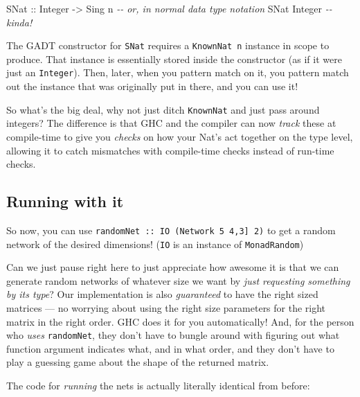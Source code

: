 \documentclass[]{article}
\newenvironment{Shaded}{}{}
\newcommand{\CommentTok}[1]{\textcolor[rgb]{0.38,0.63,0.69}{\textit{#1}}}
\newcommand{\DataTypeTok}[1]{\textcolor[rgb]{0.56,0.13,0.00}{#1}}
\newcommand{\NormalTok}[1]{#1}
\newcommand{\OtherTok}[1]{\textcolor[rgb]{0.00,0.44,0.13}{#1}}
\begin{document}
\begin{Shaded}
\begin{Highlighting}[]
\DataTypeTok{SNat}\OtherTok{ ::} \DataTypeTok{Integer} \OtherTok{{-}\textgreater{}} \DataTypeTok{Sing}\NormalTok{ n}
\CommentTok{{-}{-} or, in normal data type notation}
\DataTypeTok{SNat} \DataTypeTok{Integer}
\CommentTok{{-}{-} kinda!}
\end{Highlighting}
\end{Shaded}

The GADT constructor for \texttt{SNat} requires a \texttt{KnownNat\ n} instance
in scope to produce. That instance is essentially stored inside the constructor
(as if it were just an \texttt{Integer}). Then, later, when you pattern match on
it, you pattern match out the instance that was originally put in there, and you
can use it!

So what's the big deal, why not just ditch \texttt{KnownNat} and just pass
around integers? The difference is that GHC and the compiler can now
\emph{track} these at compile-time to give you \emph{checks} on how your Nat's
act together on the type level, allowing it to catch mismatches with
compile-time checks instead of run-time checks.

\subsection{Running with it}\label{running-with-it}

So now, you can use
\texttt{randomNet\ ::\ IO\ (Network\ 5\ \textquotesingle{}{[}4,3{]}\ 2)} to get
a random network of the desired dimensions! (\texttt{IO} is an instance of
\texttt{MonadRandom})

Can we just pause right here to just appreciate how awesome it is that we can
generate random networks of whatever size we want by \emph{just requesting
something by its type}? Our implementation is also \emph{guaranteed} to have the
right sized matrices --- no worrying about using the right size parameters for
the right matrix in the right order. GHC does it for you automatically! And, for
the person who \emph{uses} \texttt{randomNet}, they don't have to bungle around
with figuring out what function argument indicates what, and in what order, and
they don't have to play a guessing game about the shape of the returned matrix.

The code for \emph{running} the nets is actually literally identical from
before:
\end{document}

